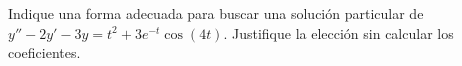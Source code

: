 Indique una forma adecuada para buscar una solución particular de $y''-2y'-3y=t^2+3e^{-t}\cos(4t)$. Justifique la elección sin calcular los coeficientes.
